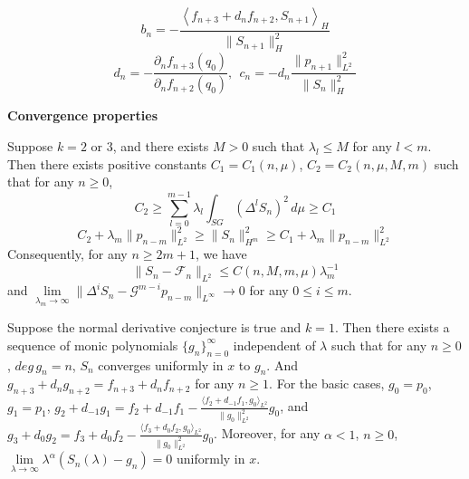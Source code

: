 \documentclass[a0, landscape]{a0poster}
\newcommand{\inner}[2]{\left \langle #1, #2\right \rangle}
\begin{document}
{\begin{textblock*}{22.5in}
\begin{minipage}{22.5in}
\begin{multicols}{2}
\begin{theorem*}
        $$b_n= -\frac{\inner{f_{n+3}+d_nf_{n+2}}{S_{n+1}}_H}{\|S_{n+1}\|_H^2}$$
        $$ d_n=-\frac{\partial_n f_{n+3}(q_0)}{\partial_nf_{n+2}(q_0)},\:\:c_n=-d_n\frac{\|p_{n+1}\|_{L^2}^2}{\|S_n\|_H^2}\label{d_n and c_n in k=1 recurrence}$$
    \end{theorem*}
    \vfill\null
    \columnbreak
    \begin{center}
        {\Large \textcolor{CornellRed}{\textbf{Convergence properties}}}
    \end{center}
    \begin{theorem*} 
    Suppose $k=2$ or $3$, and there exists $M>0$ such that $\lambda_l\le M$ for any $l<m$. Then there exists positive constants $C_1=C_1(n,\mu)$, $C_2=C_2(n,\mu,M,m)$ such that for any $n\ge 0$, $$C_2 \ge\sum\limits_{l = 0}^{m-1} \lambda_l\int_{SG}(\Delta ^l S_n)^2\,d\mu\ge C_1$$ $$
      C_2+\lambda_m\|p_{n-m}\|_{L^2}^2\ge \|S_n\|_{H^m}^2\ge C_1+
      \lambda_m \|p_{n-m}\|_{L^2}^2$$
      Consequently, for any $n\ge 2m+1$, we have$$\|S_n-\mathcal{F}_n\|_{L^2}\le
      C(n,M,m,\mu)\lambda_m^{-1}$$and
      $\lim\limits_{\lambda_m\rightarrow\infty}\|\Delta^i S_n-\mathcal{G}^{m-i}p_{n-m}\|_{L^\infty}\rightarrow 0$ for any $0\le i\le m$.
    \end{theorem*}
    \begin{theorem*}
   Suppose the normal derivative conjecture is true and $k=1$. Then there exists a sequence of monic polynomials $\{g_n\}_{n=0}^{\infty}$ independent of $\lambda$ such that for any $n\ge0$, $deg\, g_n=n$, $S_n$ converges uniformly in $x$ to $g_n$. And $g_{n+3}+d_ng_{n+2}=f_{n+3}+d_nf_{n+2}$ for any $n\ge 1$. For the basic cases, $g_0=p_0$, $g_1=p_1$, $g_{2}+d_{-1}g_{1}=f_{2}+d_{-1}f_{1}-\frac{\langle f_2+d_{-1}f_1,{g_0}\rangle_{L^2}}{{\|g_0\|_{L^2}^2}}g_{0}$, and 
$g_{3}+d_{0}g_{2}=f_{3}+d_{0}f_{2}-\frac{\langle f_3+d_{0}f_2,{g_0}\rangle_{L^2}}{{\|g_0\|_{L^2}^2}}g_{0}$. Moreover, for any $\alpha<1$, $n\ge0$, $\lim\limits_{\lambda \rightarrow\infty}\lambda^\alpha(S_n(\lambda)-g_n)=0$ uniformly in $x$.
    \end{theorem*} 
    \end{multicols}
    \end{minipage}
  \end{textblock*}%
}
\end{document}
